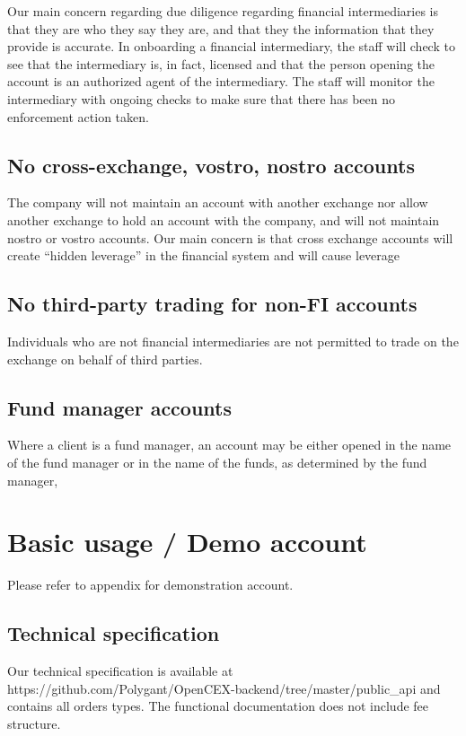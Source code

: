 Our main concern regarding due diligence regarding financial
intermediaries is that they are who they say they are, and that they
the information that they provide is accurate.  In onboarding a
financial intermediary, the staff will check to see that the
intermediary is, in fact, licensed and that the person opening the
account is an authorized agent of the intermediary.  The staff will
monitor the intermediary with ongoing checks to make sure that there
has been no enforcement action taken.

\subsection{No cross-exchange, vostro, nostro accounts}
The company will not maintain an account with another exchange nor
allow another exchange to hold an account with the company, and will
not maintain nostro or vostro accounts.  Our main concern is that
cross exchange accounts will create ``hidden leverage'' in the
financial system and will cause leverage

\subsection{No third-party trading for non-FI accounts}
Individuals who are not financial intermediaries are not permitted to
trade on the exchange on behalf of third parties.

\subsection{Fund manager accounts}
Where a client is a fund manager, an account may be either opened in the name of
the fund manager or in the name of the funds, as determined by the
fund manager,

\section{Basic usage / Demo account}
Please refer to appendix for demonstration account.

\subsection{Technical specification}
Our technical specification is available at
https://github.com/Polygant/OpenCEX-backend/tree/master/public\_api
and contains all orders types.  The functional documentation does not
include fee structure.

